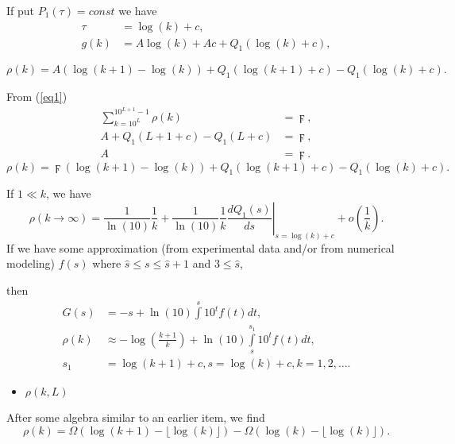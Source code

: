 \documentclass[titlepage,fleqn]{article}%
\begin{document}
If put $P_{1}(\tau)=const$ we have%
\begin{align*}
\tau &  =\log(k)+c,\\
g(k)  &  =A\log(k)+Ac+Q_{1}(\log(k)+c),
\end{align*}
%

\begin{equation}
\rho(k)=A\left(  \log(k+1)-\log(k)\right)  +Q_{1}(\log(k+1)+c)-Q_{1}%
(\log(k)+c). \label{SolK0}%
\end{equation}


From (\ref{eq1})
\begin{align}%
{\displaystyle\sum\limits_{k=10^{L}}^{10^{L+1}-1}}
\rho(k)  &  =\digamma,\\
A+Q_{1}(L+1+c)-Q_{1}(L+c)  &  =\digamma,\nonumber\\
A  &  =\digamma.\nonumber
\end{align}%
\begin{equation}
\rho(k)=\digamma\left(  \log(k+1)-\log(k)\right)  +Q_{1}(\log(k+1)+c)-Q_{1}%
(\log(k)+c). \label{SolK}%
\end{equation}


If $1\ll k$, we have%
\begin{equation}
\rho(k\rightarrow\infty)=\frac{1}{\ln(10)}\frac{1}{k}+\frac{1}{\ln(10)}%
\frac{1}{k}\left.  \frac{dQ_{1}(s)}{ds}\right\vert _{s=\log(k)+c}+o\left(
\frac{1}{k}\right)  . \label{AsymptK}%
\end{equation}
If we have some approximation (from experimental data and/or from numerical
modeling) $f(s)$ where $\hat{s}\leq s\leq\hat{s}+1$ and $3\leq\hat{s}$,

\noindent then%
\begin{align*}
G(s) &  =-s+\ln(10)%
{\displaystyle\int\limits^{s}}
10^{t}f(t)dt,\\
\rho(k) &  \approx-\log\left(  \frac{k+1}{k}\right)  +\ln(10)%
{\displaystyle\int\limits_{s}^{s_{1}}}
10^{t}f(t)dt,\\
s_{1} &  =\log\left(  k+1\right)  +c,s=\log\left(  k\right)  +c,k=1,2,\ldots.
\end{align*}


\begin{itemize}
\item $\rho(k,L)$
\end{itemize}

After some algebra similar to an earlier item, we find%
\begin{equation}
\rho(k)=\Omega(\log(k+1)-\lfloor\log(k)\rfloor)-\Omega(\log(k)-\lfloor
\log(k)\rfloor). \label{SolK_L}%
\end{equation}
\end{document}
